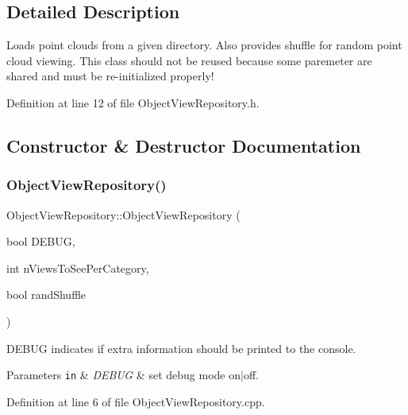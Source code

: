 \subsection{Detailed Description}
Loads point clouds from a given directory. Also provides shuffle for random point cloud viewing. This class should not be reused because some paremeter are shared and must be re-\/initialized properly! 

Definition at line 12 of file Object\+View\+Repository.\+h.



\subsection{Constructor \& Destructor Documentation}
\mbox{\label{class_object_view_repository_a1197d0cb7fe1bd05ff2da5a8cf215cc5}} 
\subsubsection{\texorpdfstring{Object\+View\+Repository()}{ObjectViewRepository()}}
{\footnotesize\ttfamily Object\+View\+Repository\+::\+Object\+View\+Repository (\begin{DoxyParamCaption}\item[{bool}]{D\+E\+B\+UG,  }\item[{int}]{n\+Views\+To\+See\+Per\+Category,  }\item[{bool}]{rand\+Shuffle }\end{DoxyParamCaption})}

D\+E\+B\+UG indicates if extra information should be printed to the console.


\begin{DoxyParams}[1]{Parameters}
\mbox{\tt in}  & {\em D\+E\+B\+UG} & set debug mode on$\vert$off. \\
\hline
\end{DoxyParams}


Definition at line 6 of file Object\+View\+Repository.\+cpp.

\mbox{\label{class_object_view_repository_a168d69e2f40f5f97bd8b56f3eca35cde}} 
